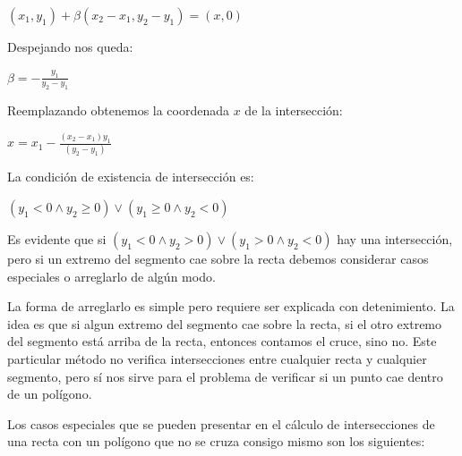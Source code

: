 \vspace{0.2cm}
$(x_1, y_1) + \beta(x_2 - x_1, y_2 - y_1) = (x, 0)$
\vspace{0.2cm}

Despejando nos queda:

\vspace{0.2cm}
$\beta = -\displaystyle\frac{y_1}{y_2 - y_1}$
\vspace{0.2cm}

Reemplazando obtenemos la coordenada $x$ de la intersección:

\vspace{0.2cm}
$x = x_1 -\displaystyle\frac{(x_2 - x_1)y_1}{(y_2 - y_1)}$
\vspace{0.2cm}

La condición de existencia de intersección es:

\vspace{0.2cm}
$( y_1 < 0 \wedge y_2 \ge 0 ) \vee ( y_1 \ge 0 \wedge y_2 < 0 )$
\vspace{0.2cm}

Es evidente que si $( y_1 < 0 \wedge y_2 > 0 ) \vee ( y_1 > 0 \wedge y_2 < 0 )$ hay una intersección, pero si un
extremo del segmento cae sobre la recta debemos considerar casos especiales o arreglarlo de algún modo.

La forma de arreglarlo es simple pero requiere ser explicada con detenimiento. La idea es que si algun
extremo del segmento cae sobre la recta, si el otro extremo del segmento está arriba de la recta, entonces
contamos el cruce, sino no. Este particular método no verifica intersecciones entre cualquier recta y
cualquier segmento, pero sí nos sirve para el problema de verificar si un punto cae dentro de un polígono.

Los casos especiales que se pueden presentar en el cálculo de intersecciones de una recta con un polígono
que no se cruza consigo mismo son los siguientes:

